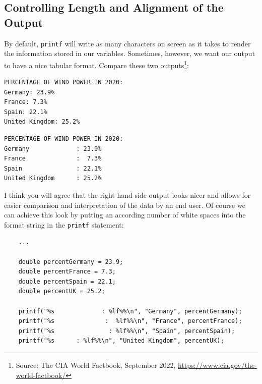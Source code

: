 \subsection{Controlling Length and Alignment of the Output}
By default, \texttt{printf} will write as many characters on screen as it takes to render the information stored in our variables. Sometimes, however, we want our output to have a nice tabular format. Compare these two outputs\footnote{Source: The CIA World Factbook, September 2022, \url{https://www.cia.gov/the-world-factbook/}}:
\begin{tcbraster}[raster columns=2,
                  raster equal height,
                  nobeforeafter,
                  raster column skip=0.2cm]
\begin{cmdbox}
\begin{verbatim}
PERCENTAGE OF WIND POWER IN 2020:
Germany: 23.9%
France: 7.3%
Spain: 22.1%
United Kingdom: 25.2%
\end{verbatim}
\end{cmdbox}
%
\begin{cmdbox}
\begin{verbatim}
PERCENTAGE OF WIND POWER IN 2020:
Germany             : 23.9%
France              :  7.3%
Spain               : 22.1%
United Kingdom      : 25.2%
\end{verbatim}
\end{cmdbox}
\end{tcbraster}

I think you will agree that the right hand side output looks nicer and allows for easier comparison and interpretation of the data by an end user. Of course we can achieve this look by putting an according number of white spaces into the format string in the \texttt{printf} statement:
\begin{codebox}[manuallyAlignedOutput.c]
\begin{verbatim}
    ...

    double percentGermany = 23.9;
    double percentFrance = 7.3;
    double percentSpain = 22.1;
    double percentUK = 25.2;

    printf("%s             : %lf%%\n", "Germany", percentGermany);
    printf("%s              :  %lf%%\n", "France", percentFrance);
    printf("%s               : %lf%%\n", "Spain", percentSpain);
    printf("%s      : %lf%%\n", "United Kingdom", percentUK);
\end{verbatim}
\end{codebox}

